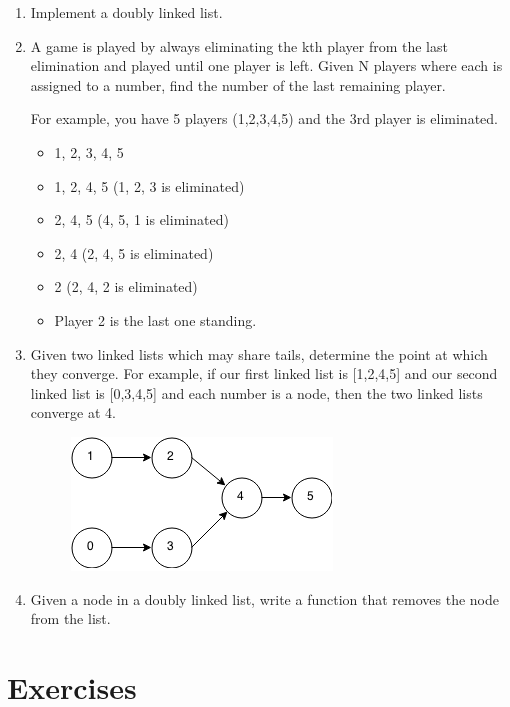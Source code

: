 \documentclass[11pt,oneside]{book}
\makeatletter
\def\maxwidth#1{\ifdim\Gin@nat@width>#1 #1\else\Gin@nat@width\fi}
\makeatother
\begin{document}
\begin{enumerate}
\item Implement a doubly linked list.
\item A game is played by always eliminating the kth player from the last elimination and played until one player is left. Given N players where each is assigned to a number, find the number of the last remaining player.

For example, you have 5 players (1,2,3,4,5) and the 3rd player is eliminated.

\begin{itemize}
\item 1, 2, 3, 4, 5 
\item 1, 2, 4, 5 (1, 2, 3 is eliminated)
\item 2, 4, 5 (4, 5, 1 is eliminated)
\item 2, 4 (2, 4, 5 is eliminated)
\item 2 (2, 4, 2 is eliminated)
\item Player 2 is the last one standing.
\end{itemize}
\item Given two linked lists which may share tails, determine the point at which they converge. For example, if our first linked list is [1,2,4,5] and our second linked list is [0,3,4,5] and each number is a node, then the two linked lists converge at 4. 
\vspace{5px}\begin{figure}[H]\centering
        \includegraphics[width=0.66\maxwidth{\textwidth}]{linkedlistconverge.png}
        \end{figure}
\item Given a node in a doubly linked list, write a function that removes the node from the list. 
\end{enumerate}

        \section{ Exercises }
        
\end{document}
